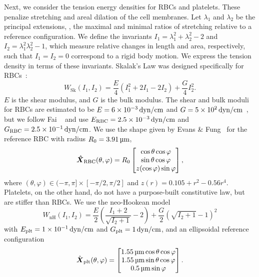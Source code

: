 Next, we consider the tension energy densities for RBCs and platelets. These penalize stretching and areal
dilation of the cell membranes. Let $\lambda_1$ and $\lambda_2$ be the principal extensions, , the
maximal and minimal ratios of stretching relative to a reference configuration. We define the invariants
$I_1=\lambda_1^2+\lambda_2^2-2$ and $I_2 = \lambda_1^2\lambda_2^2-1$, which measure relative changes in length and
area, respectively, such that $I_1 = I_2 = 0$ correspond to a rigid body motion. We express the tension density in
terms of these invariants. Skalak's Law was designed specifically for RBCs~\cite{Skalak:1973tp}:
\begin{equation}\label{eq:skalak-law}
    W_\text{Sk}(I_1, I_2) = \frac{E}4\left(I_1^2 + 2I_1 - 2I_2\right) + \frac{G}4 I_2^2.
\end{equation}
$E$ is the shear modulus, and $G$ is the bulk modulus. The shear and bulk moduli for RBCs are estimated to be
$E = 6\sci{-3}\dynpercm$ and $G = 5\sci2\dynpercm$~\cite{Mohandas:1994tg}, but we follow Fai ~%
\cite{Fai:2013do} and use $\rbc{E} = 2.5\sci{-3}\dynpercm$ and $\rbc{G} = 2.5\sci{-1}\dynpercm$. We use
the shape given by Evans \& Fung~\cite{Evans:1972uf} for the reference RBC with radius $R_0 = 3.91\um$,
\begin{equation*}
    {\boldsymbol{\hat{X}}}_\text{RBC}(\theta, \varphi) = R_0\begin{bmatrix}
            \cos\theta\cos\varphi \\
            \sin\theta\cos\varphi \\
            z(\cos\varphi)\sin\varphi
    \end{bmatrix},
\end{equation*}
where $(\theta, \varphi)\in(-\pi, \pi]\times[-\pi/2, \pi/2]$ and $z(r) = 0.105 + r^2 - 0.56r^4$. Platelets, on the
other hand, do not have a purpose-built constitutive law, but are stiffer than RBCs. We use the neo-Hookean model
\begin{equation}\label{eq:neohookean}
    W_\text{nH}(I_1, I_2) = \frac{E}2\left(\frac{I_1+2}{\sqrt{I_2+1}}-2\right) + \frac{G}2 {\left(\sqrt{I_2+1}-1\right)}^2
\end{equation}
with $\plt{E} = 1\sci{-1}\dynpercm$ and $\plt{G} = 1\dynpercm$, and an ellipsoidal reference configuration~%
\cite{Frojmovic:1982wk}
\begin{equation*}
    \plt{\hat{\vec{X}}}(\theta, \varphi) = \begin{bmatrix}
            1.55\um\cos\theta\cos\varphi \\
            1.55\um\sin\theta\cos\varphi \\
            0.5\um\sin\varphi
    \end{bmatrix}.
\end{equation*}


